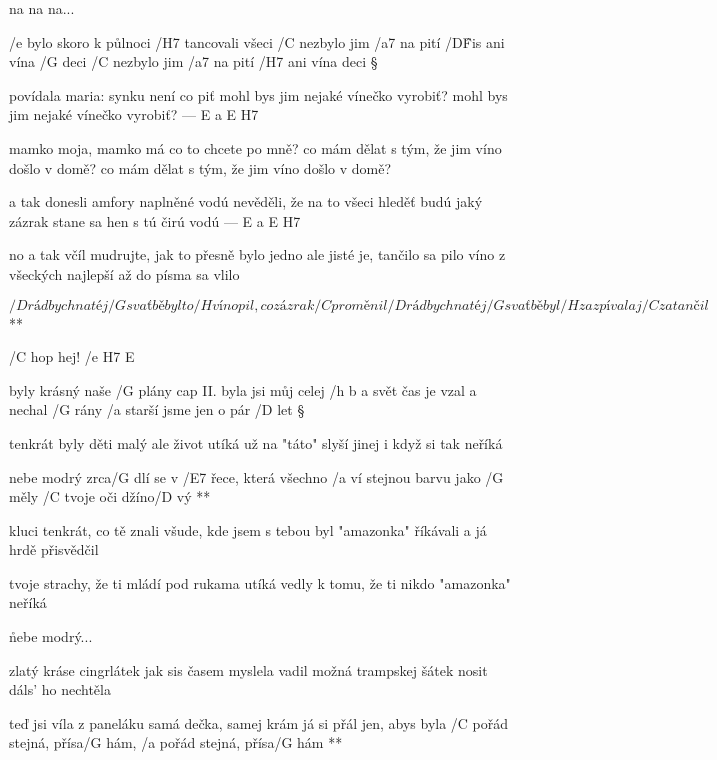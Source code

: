 na na na...




/e bylo skoro k půlnoci /H7 tancovali všeci
/C nezbylo jim /a7 na pití /D\^Fis ani vína /G deci
/C nezbylo jim /a7 na pití /H7 ani vína deci \S

povídala maria: synku není co piť
mohl bys jim nejaké vínečko vyrobiť?
mohl bys jim nejaké vínečko vyrobiť? --- E a E H7 \s

mamko moja, mamko má co to chcete po mně?
co mám dělat s tým, že jim víno došlo v domě?
co mám dělat s tým, že jim víno došlo v domě? \s

a tak donesli amfory naplněné vodú
nevěděli, že na to všeci hleděť budú
jaký zázrak stane sa hen s tú čirú vodú --- E a E H7\s

no a tak včíl mudrujte, jak to přesně bylo
jedno ale jisté je, tančilo sa pilo
víno z všeckých najlepší až do písma sa vlilo

\R  \[ /D rád bych na téj /G svaťbě byl
    to /H víno pil, co zázrak /C proměnil
    /D rád bych na téj /G svaťbě byl
    /H zazpíval aj /C zatančil \] **

/C hop hej! /{e H7 E} ~




byly krásný naše /G plány \hfill cap II.
byla jsi můj celej /{h b a} svět
čas je vzal a nechal /G rány
/a starší jsme jen o pár /D let \S

tenkrát byly děti malý
ale život utíká
už na "táto" slyší jinej
i když si tak neříká

\R  nebe modrý zrca/G dlí se
    v /E7 řece, která všechno /a ví
    stejnou barvu jako /G měly
    /C tvoje oči džíno/D vý **

kluci tenkrát, co tě znali
všude, kde jsem s tebou byl
"amazonka" říkávali
a já hrdě přisvědčil \s

tvoje strachy, že ti mládí
pod rukama utíká
vedly k tomu, že ti nikdo
"amazonka" neříká

\r nebe modrý...

zlatý kráse cingrlátek
jak sis časem myslela
vadil možná trampskej šátek
nosit dáls' ho nechtěla

\R  teď jsi víla z paneláku
    samá dečka, samej krám
    já si přál jen, abys byla
    /C pořád stejná, přísa/G hám, /a pořád stejná, přísa/G hám **




